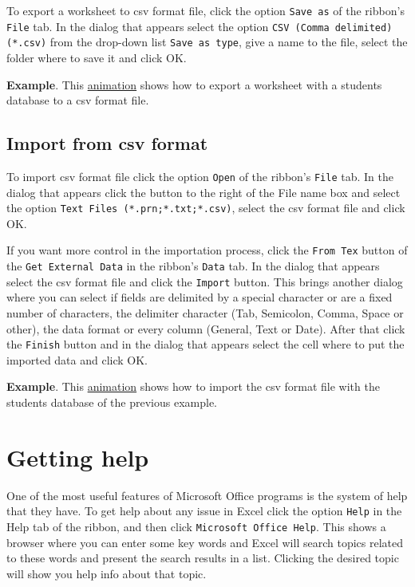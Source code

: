 To export a worksheet to csv format file, click the option \texttt{Save as} of the ribbon's \texttt{File} tab. In the dialog that appears select the option \texttt{CSV (Comma delimited) (*.csv)} from the drop-down list \texttt{Save as type}, give a name to the file, select the folder where to save it and click OK.

\textbf{Example}. This \href{http://aprendeconalf.es/office/excel/manual/img/example_export_csv.gif}{animation} shows
how to export a worksheet with a students database to a csv format file.


\subsection{Import from csv format}\hypertarget{import-from-csv-format}{}\label{import-from-csv-format}

To import csv format file click the option \texttt{Open} of the ribbon's \texttt{File} tab. In the dialog that appears click the button to the right of the File name box and select the option \texttt{Text Files (*.prn;*.txt;*.csv)}, select the csv format file and click OK.

If you want more control in the importation process, click the \texttt{From Tex} button of the \texttt{Get External Data} in the ribbon's \texttt{Data} tab. In the dialog that appears select the csv format file and click the \texttt{Import} button. This brings another dialog where you can select if fields are delimited by a special character or are a fixed number of characters, the delimiter character (Tab, Semicolon, Comma, Space or other), the data format or every column (General, Text or Date). After that click the \texttt{Finish} button and in the dialog that appears select the cell where to put the imported data and click OK.

\textbf{Example}. This \href{http://aprendeconalf.es/office/excel/manual/img/example_import_csv.gif}{animation}
shows how to import the csv format file with the students database of the previous example.


\section{Getting help}\hypertarget{getting-help}{}\label{getting-help} 

One of the most useful features of Microsoft Office programs is the system of help that they have. To get help about any issue in Excel click the option \texttt{Help} in the Help tab of the ribbon, and then click \texttt{Microsoft Office Help}. This shows a browser where you can enter some key words and Excel will search topics related to these words and present the search results in a list. Clicking the desired topic will show you help info about that topic.


